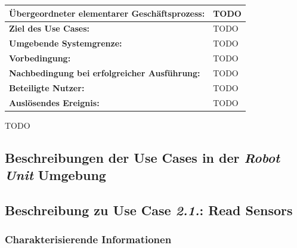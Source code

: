 				\begin{table}[H]
					\centering
					\begin{tabularx}{\textwidth}{|p{5cm}|X|}
						\hline
						\textbf{Übergeordneter elementarer Geschäftsprozess:} & TODO  \\ \hline
						\textbf{Ziel des Use Cases:} & TODO \\ \hline
						\textbf{Umgebende Systemgrenze:} & TODO \\ \hline
						\textbf{Vorbedingung:} & TODO \\ \hline
						\textbf{Nachbedingung bei erfolgreicher Ausführung:} & TODO \\ \hline
						\textbf{Beteiligte Nutzer:} & TODO \\ \hline
						\textbf{Auslösendes Ereignis:} & TODO \\
						\hline
					\end{tabularx}
				\end{table}
				
				TODO
				
				
				\pagebreak
		\subsection{Beschreibungen der Use Cases in der \emph{Robot Unit} Umgebung}
			\subsection*{Beschreibung zu Use Case \emph{2.1.}: Read Sensors}
				
				\subsubsection*{Charakterisierende Informationen}
				

